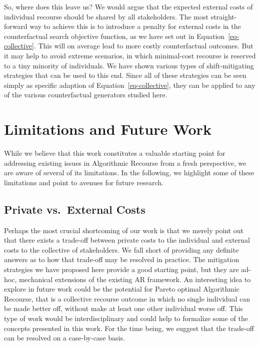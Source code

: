 \documentclass[
  conference]{IEEEtran}
\begin{document}
So, where does this leave us? We would argue that the expected external
costs of individual recourse should be shared by all stakeholders. The
most straight-forward way to achieve this is to introduce a penalty for
external costs in the counterfactual search objective function, as we
have set out in Equation~\ref{eq-collective}. This will on average lead
to more costly counterfactual outcomes. But it may help to avoid extreme
scenarios, in which minimal-cost recourse is reserved to a tiny minority
of individuals. We have shown various types of shift-mitigating
strategies that can be used to this end. Since all of these strategies
can be seen simply as specific adaption of Equation~\ref{eq-collective},
they can be applied to any of the various counterfactual generators
studied here.

\hypertarget{sec-limit}{%
\section{Limitations and Future Work}\label{sec-limit}}

While we believe that this work constitutes a valuable starting point
for addressing existing issues in Algorithmic Recourse from a fresh
perspective, we are aware of several of its limitations. In the
following, we highlight some of these limitations and point to avenues
for future research.

\hypertarget{private-vs.-external-costs}{%
\subsection{Private vs.~External
Costs}\label{private-vs.-external-costs}}

Perhaps the most crucial shortcoming of our work is that we merely point
out that there exists a trade-off between private costs to the
individual and external costs to the collective of stakeholders. We fall
short of providing any definite answers as to how that trade-off may be
resolved in practice. The mitigation strategies we have proposed here
provide a good starting point, but they are ad-hoc, mechanical
extensions of the existing AR framework. An interesting idea to explore
in future work could be the potential for Pareto optimal Algorithmic
Recourse, that is a collective recourse outcome in which no single
individual can be made better off, without make at least one other
individual worse off. This type of work would be interdisciplinary and
could help to formalize some of the concepts presented in this work. For
the time being, we suggest that the trade-off can be resolved on a
case-by-case basis.
\end{document}
